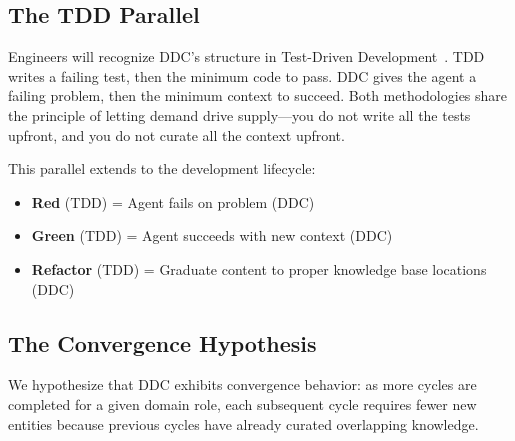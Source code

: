 \documentclass[11pt,a4paper]{article}
\begin{document}
\subsection{The TDD Parallel}

Engineers will recognize DDC's structure in Test-Driven Development~\citep{beck2002tdd}. TDD writes a failing test, then the minimum code to pass. DDC gives the agent a failing problem, then the minimum context to succeed. Both methodologies share the principle of letting demand drive supply---you do not write all the tests upfront, and you do not curate all the context upfront.

This parallel extends to the development lifecycle:

\begin{itemize}
  \item \textbf{Red} (TDD) = Agent fails on problem (DDC)
  \item \textbf{Green} (TDD) = Agent succeeds with new context (DDC)
  \item \textbf{Refactor} (TDD) = Graduate content to proper knowledge base locations (DDC)
\end{itemize}

\subsection{The Convergence Hypothesis}
\label{sec:convergence}

We hypothesize that DDC exhibits convergence behavior: as more cycles are completed for a given domain role, each subsequent cycle requires fewer new entities because previous cycles have already curated overlapping knowledge.

%
\end{document}

